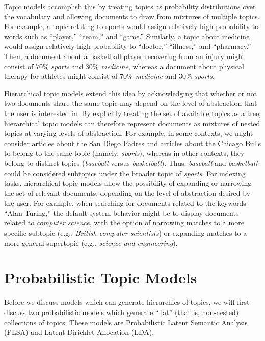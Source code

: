 \documentclass{article}
\begin{document}
Topic models accomplish this by treating topics as probability distributions over the vocabulary and allowing documents to draw from mixtures of multiple topics.
For example, a topic relating to sports would assign relatively high probability to words such as ``player,'' ``team,'' and ``game.''
Similarly, a topic about medicine would assign relatively high probability to ``doctor,'' ``illness,'' and ``pharmacy.''
Then, a document about a basketball player recovering from an injury might consist of $70\%$ \emph{sports} and $30\%$ \emph{medicine}, whereas a document about physical therapy for athletes might consist of $70\%$ \emph{medicine} and $30\%$ \emph{sports}.

Hierarchical topic models extend this idea by acknowledging that whether or not two documents share the same topic may depend on the level of abstraction that the user is interested in.
By explicitly treating the set of available topics as a tree, hierarchical topic models can therefore represent documents as mixtures of nested topics at varying levels of abstraction.
For example, in some contexts, we might consider articles about the San Diego Padres and articles about the Chicago Bulls to belong to the same topic (namely, \emph{sports}), whereas in other contexts, they belong to distinct topics (\emph{baseball} versus \emph{basketball}).
Thus, \emph{baseball} and \emph{basketball} could be considered subtopics under the broader topic of \emph{sports}.
For indexing tasks, hierarchical topic models allow the possibility of expanding or narrowing the set of relevant documents, depending on the level of abstraction desired by the user.
For example, when searching for documents related to the keywords ``Alan Turing,'' the default system behavior might be to display documents related to \emph{computer science}, with the option of narrowing matches to a more specific subtopic (e.g., \emph{British computer scientists}) or expanding matches to a more general supertopic (e.g., \emph{science and engineering}).

\section{Probabilistic Topic Models}

Before we discuss models which can generate hierarchies of topics, we will first discuss two probabilistic models which generate ``flat'' (that is, non-nested) collections of topics.
These models are Probabilistic Latent Semantic Analysis (PLSA) and Latent Dirichlet Allocation (LDA).
\end{document}
